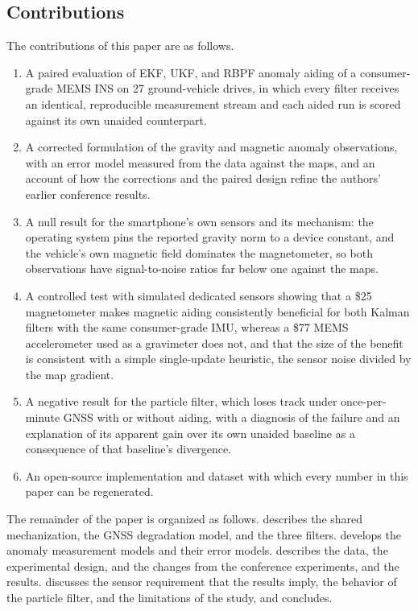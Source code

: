 \subsection{Contributions}

The contributions of this paper are as follows.
\begin{enumerate}
  \item A paired evaluation of EKF, UKF, and RBPF anomaly aiding of a consumer-grade MEMS INS on 27 ground-vehicle drives, in which every filter receives an identical, reproducible measurement stream and each aided run is scored against its own unaided counterpart.
  \item A corrected formulation of the gravity and magnetic anomaly observations, with an error model measured from the data against the maps, and an account of how the corrections and the paired design refine the authors' earlier conference results.
  \item A null result for the smartphone's own sensors and its mechanism: the operating system pins the reported gravity norm to a device constant, and the vehicle's own magnetic field dominates the magnetometer, so both observations have signal-to-noise ratios far below one against the maps.
  \item A controlled test with simulated dedicated sensors showing that a \$25 magnetometer makes magnetic aiding consistently beneficial for both Kalman filters with the same consumer-grade IMU, whereas a \$77 MEMS accelerometer used as a gravimeter does not, and that the size of the benefit is consistent with a simple single-update heuristic, the sensor noise divided by the map gradient.
  \item A negative result for the particle filter, which loses track under once-per-minute GNSS with or without aiding, with a diagnosis of the failure and an explanation of its apparent gain over its own unaided baseline as a consequence of that baseline's divergence.
  \item An open-source implementation \citep{strapdown-rs} and dataset with which every number in this paper can be regenerated.
\end{enumerate}

The remainder of the paper is organized as follows.  describes the shared mechanization, the GNSS degradation model, and the three filters.  develops the anomaly measurement models and their error models.  describes the data, the experimental design, and the changes from the conference experiments, and  the results.  discusses the sensor requirement that the results imply, the behavior of the particle filter, and the limitations of the study, and  concludes.
